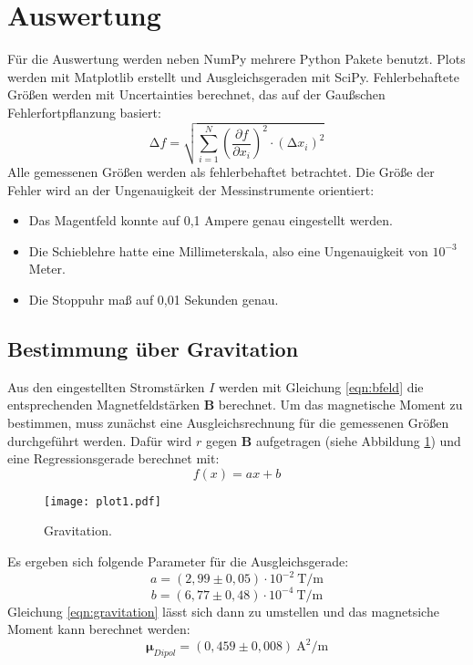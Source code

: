 \section{Auswertung}
\label{sec:Auswertung}

Für die Auswertung werden neben NumPy\cite{numpy} mehrere Python Pakete benutzt.
Plots werden mit Matplotlib\cite{matplotlib} erstellt und Ausgleichsgeraden mit SciPy\cite{scipy}.
Fehlerbehaftete Größen werden mit Uncertainties\cite{uncertainties} berechnet, das auf der Gaußschen Fehlerfortpflanzung basiert:
\begin{equation}
    \increment f = \sqrt{\sum_{i=1}^N \left( \frac{\partial f}{\partial x_i} \right)^{2} \cdot (\increment x_i)^{2}}
\end{equation}
Alle gemessenen Größen werden als fehlerbehaftet betrachtet.
Die Größe der Fehler wird an der Ungenauigkeit der Messinstrumente orientiert:
\begin{itemize}
  \item Das Magentfeld konnte auf 0,1 Ampere genau eingestellt werden.
  \item Die Schieblehre hatte eine Millimeterskala, also eine Ungenauigkeit von $10^{-3}$ Meter.
  \item Die Stoppuhr maß auf 0,01 Sekunden genau.
\end{itemize}

\subsection{Bestimmung über Gravitation}

Aus den eingestellten Stromstärken $I$ werden mit Gleichung \eqref{eqn:bfeld} die entsprechenden Magnetfeldstärken $\symbf{B}$ berechnet.
Um das magnetische Moment zu bestimmen,
muss zunächst eine Ausgleichsrechnung für die gemessenen Größen durchgeführt werden.
Dafür wird $r$ gegen $\symbf{B}$ aufgetragen (siehe Abbildung \ref{fig:plot1}) und eine Regressionsgerade berechnet mit:
\begin{equation}
  f(x) = ax+b
\end{equation}
\begin{figure}
  \centering
  \texttt{[image: plot1.pdf]}
  \caption{Gravitation.}
  \label{fig:plot1}
\end{figure}
Es ergeben sich folgende Parameter für die Ausgleichsgerade:
\begin{equation*}
  a = (2,99 \pm 0,05) \cdot 10^{-2} \: \text{T/m}
\end{equation*}
\begin{equation*}
  b = (6,77 \pm 0,48) \cdot 10^{-4} \: \text{T/m}
\end{equation*}
Gleichung \eqref{eqn:gravitation} lässt sich dann zu umstellen und das magnetsiche Moment kann berechnet werden:
\begin{equation*}
  \symbf{\mu}_{Dipol} = (0,459 \pm 0,008) \: \text{A}^{2}/\text{m}
\end{equation*}


